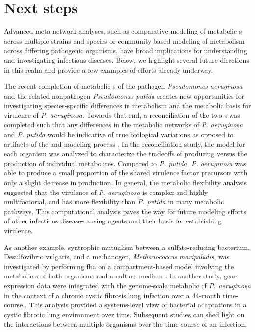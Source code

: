 \section{Next steps}

Advanced meta-network analyses, such as comparative modeling 
of metabolic s across multiple strains and 
species or community-based modeling of metabolism across 
differing pathogenic organisms, have broad implications 
for understanding and investigating infectious diseases. 
Below, we highlight several future directions in this 
realm and provide a few examples of efforts already underway.

The recent completion of metabolic s of the 
pathogen \textit{Pseudomonas aeruginosa} \cite{Oberhardt:2008fr} and the related nonpathogen 
\textit{Pseudomonas putida} \cite{Puchalka:2008ct} creates new opportunities for 
investigating species-specific differences in metabolism 
and the metabolic basis for virulence of \textit{P. aeruginosa}. 
Towards that end, a reconciliation of the two s 
was completed such that any differences in the metabolic 
networks of \textit{P. aeruginosa} and \textit{P. putida} would be indicative 
of true biological variations as opposed to artifacts of 
the  and modeling process \cite{Oberhardt:2011jq}. In the reconciliation 
study, the model for each organism was analyzed to characterize 
the tradeoffs of producing  versus the production of 
individual metabolites. Compared to \textit{P. putida}, \textit{P. aeruginosa} 
was able to produce a small proportion of the shared virulence 
factor precursors with only a slight decrease in  
production. In general, the metabolic flexibility analysis 
suggested that the virulence of \textit{P. aeruginosa} is complex 
and highly multifactorial, and has more flexibility than 
\textit{P. putida} in many metabolic pathways. This computational 
analysis paves the way for future modeling efforts of other 
infectious disease-causing agents and their basis for establishing 
virulence.

As another example, syntrophic mutualism between a sulfate-reducing 
bacterium, Desulfovibrio vulgaris, and a methanogen, \textit{Methanococcus 
maripaludis}, was investigated by performing \gls{fba} on a compartment-based 
model involving the metabolic s of both organisms 
and a culture medium \cite{Stolyar:2007jh}. In another study, gene expression data 
were integrated with the genome-scale metabolic  of 
\textit{P. aeruginosa} in the context of a chronic cystic fibrosis lung 
infection over a 44-month time-course \cite{Oberhardt:2010bp}. This analysis provided 
a systems-level view of bacterial adaptations in a cystic fibrotic 
lung environment over time. Subsequent studies can shed light on 
the interactions between multiple organisms over the time course 
of an infection.

